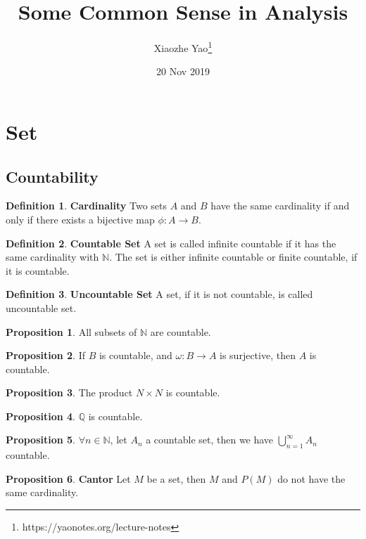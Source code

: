 \documentclass{article}
\title{Some Common Sense in Analysis}
\author{Xiaozhe Yao\footnote{https://yaonotes.org/lecture-notes}}
\date{20 Nov 2019}
\theoremstyle{definition}
\newtheorem{defi}{Definition}[subsection]
\newtheorem{prop}{Proposition}[subsection]
\begin{document}
\maketitle

\section{Set}

\subsection{Countability}

\begin{defi}
\textbf{Cardinality} Two sets $A$ and $B$ have the same cardinality if and only if there exists a bijective map $\phi: A\to B$.
\end{defi}

\begin{defi}
\textbf{Countable Set} A set is called infinite countable if it has the same cardinality with $\mathbb{N}$. The set is either infinite countable or finite countable, if it is countable.
\end{defi}

\begin{defi}
\textbf{Uncountable Set} A set, if it is not countable, is called uncountable set.
\end{defi}

\begin{prop}
All subsets of $\mathbb{N}$ are countable.
\end{prop}

\begin{prop}
If $B$ is countable, and $\omega: B\to A$ is surjective, then $A$ is countable.
\end{prop}

\begin{prop}
The product $N \times N$ is countable.
\end{prop}

\begin{prop}
$\mathbb{Q}$ is countable.
\end{prop}

\begin{prop}
$\forall n\in \mathbb{N}$, let $A_n$ a countable set, then we have $\bigcup_{n=1}^{\infty}A_{n}$ countable.
\end{prop}

\begin{prop}
\textbf{Cantor} Let $M$ be a set, then $M$ and $P(M)$ do not have the same cardinality.
\end{prop}
\end{document}
